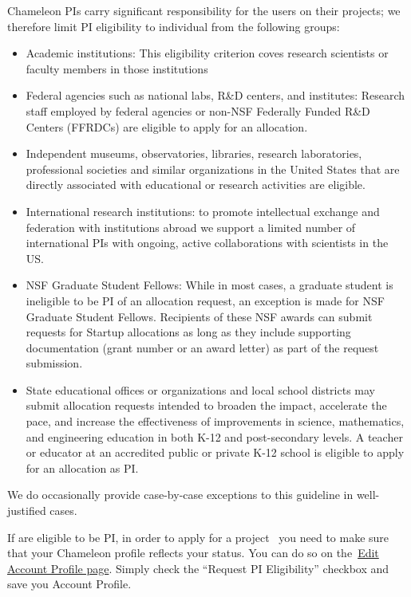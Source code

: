 Chameleon PIs carry significant responsibility for the users on their
projects; we therefore limit PI eligibility to individual from the
following groups:

\begin{itemize}
\tightlist
\item
  Academic institutions: This eligibility criterion coves research
  scientists or faculty members in those institutions
\item
  Federal agencies such as national labs, R\&D centers, and institutes:
  Research staff employed by federal agencies or non-NSF Federally
  Funded R\&D Centers (FFRDCs) are eligible to apply for an allocation.
\item
  Independent museums, observatories, libraries, research laboratories,
  professional societies and similar organizations in the United States
  that are directly associated with educational or research activities
  are eligible.
\item
  International research institutions: to promote intellectual exchange
  and federation with institutions abroad we support a limited number of
  international PIs with ongoing, active collaborations with scientists
  in the US.~
\item
  NSF Graduate Student Fellows: While in most cases, a graduate student
  is ineligible to be PI of an allocation request, an exception is made
  for NSF Graduate Student Fellows. Recipients of these NSF awards can
  submit requests for Startup allocations as long as they include
  supporting documentation (grant number or an award letter) as part of
  the request submission.
\item
  State educational offices or organizations and local school districts
  may submit allocation requests intended to broaden the impact,
  accelerate the pace, and increase the effectiveness of improvements in
  science, mathematics, and engineering education in both K-12 and
  post-secondary levels. A teacher or educator at an accredited public
  or private K-12 school is eligible to apply for an allocation as PI.
\end{itemize}

We do occasionally provide case-by-case exceptions to this guideline in
well-justified cases.~

If are eligible to be PI, in order to apply for a project ~you need to
make sure that your Chameleon profile reflects your status. You can do
so on the~\href{https://www.chameleoncloud.org/user/profile/edit}{Edit
Account Profile page}. Simply check the ``Request PI Eligibility''
checkbox and save you Account Profile.

